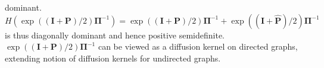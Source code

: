 dominant. $H(\exp((\mathbf{I} + \mathbf{P})/2)\bm{\Pi}^{-1}) =
\exp((\mathbf{I} + \mathbf{P})/2)\bm{\Pi}^{-1} + \exp((\mathbf{I} +
\hat{\mathbf{P}})/2)\bm{\Pi}^{-1}$ is thus diagonally dominant and
hence positive semidefinite.  $\exp((\mathbf{I} +
\mathbf{P})/2)\bm{\Pi}^{-1}$ can be viewed as a diffusion kernel on
directed graphs, extending \citet{kondor02:_diffus} notion of
diffusion kernels for undirected graphs.
